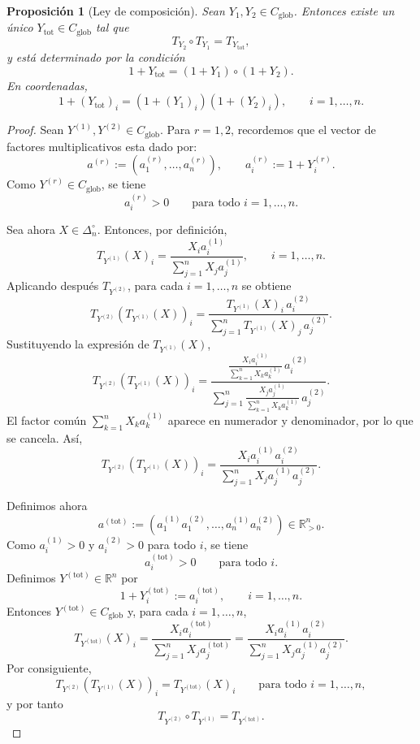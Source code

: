 ﻿\documentclass[12pt]{article}
\newtheorem{proposicion}{Proposición}[section]
\begin{document}
\begin{proposicion}[Ley de composición]\label{prop:composicionGlobal}
Sean $Y_1,Y_2\in C_{\mathrm{glob}}$. Entonces existe un único $Y_{\mathrm{tot}}\in C_{\mathrm{glob}}$ tal que
\[
T_{Y_2}\circ T_{Y_1}=T_{Y_{\mathrm{tot}}},
\]
y está determinado por la condición
\[
1+Y_{\mathrm{tot}}
=
(1+Y_1)\circ(1+Y_2).
\]
En coordenadas,
\[
1+(Y_{\mathrm{tot}})_i=(1+(Y_1)_i)(1+(Y_2)_i),
\qquad i=1,\dots,n.
\]
\end{proposicion}
\begin{proof}
Sean $Y^{(1)},Y^{(2)}\in C_{\mathrm{glob}}$. Para $r=1,2$, recordemos que el vector de factores multiplicativos esta dado por:
\[
a^{(r)}:=(a_1^{(r)},\dots,a_n^{(r)}),\qquad a_i^{(r)}:=1+Y_i^{(r)}.
\]
Como $Y^{(r)}\in C_{\mathrm{glob}}$, se tiene
\[
a_i^{(r)}>0\qquad \text{para todo } i=1,\dots,n.
\]

Sea ahora $X\in\Delta_n^\circ$. Entonces, por definición,
\[
T_{Y^{(1)}}(X)_i=\frac{X_i a_i^{(1)}}{\sum_{j=1}^n X_j a_j^{(1)}},\qquad i=1,\dots,n.
\]
Aplicando después $T_{Y^{(2)}}$, para cada $i=1,\dots,n$ se obtiene
\[
T_{Y^{(2)}}(T_{Y^{(1)}}(X))_i
=
\frac{T_{Y^{(1)}}(X)_i\,a_i^{(2)}}{\sum_{j=1}^n T_{Y^{(1)}}(X)_j\,a_j^{(2)}}.
\]
Sustituyendo la expresión de $T_{Y^{(1)}}(X)$,
\[
T_{Y^{(2)}}(T_{Y^{(1)}}(X))_i
=
\frac{
\displaystyle
\frac{X_i a_i^{(1)}}{\sum_{k=1}^n X_k a_k^{(1)}}\,a_i^{(2)}
}{
\displaystyle
\sum_{j=1}^n
\frac{X_j a_j^{(1)}}{\sum_{k=1}^n X_k a_k^{(1)}}\,a_j^{(2)}
}.
\]
El factor común $\sum_{k=1}^n X_k a_k^{(1)}$ aparece en numerador y denominador, por lo que se cancela. Así,
\[
T_{Y^{(2)}}(T_{Y^{(1)}}(X))_i
=
\frac{X_i a_i^{(1)} a_i^{(2)}}{\sum_{j=1}^n X_j a_j^{(1)} a_j^{(2)}}.
\]

Definimos ahora
\[
a^{(\mathrm{tot})}:=(a_1^{(1)}a_1^{(2)},\dots,a_n^{(1)}a_n^{(2)})\in \mathbb R_{>0}^n.
\]
Como $a_i^{(1)}>0$ y $a_i^{(2)}>0$ para todo $i$, se tiene
\[
a_i^{(\mathrm{tot})}>0\qquad \text{para todo } i.
\]
Definimos $Y^{(\mathrm{tot})}\in\mathbb R^n$ por
\[
1+Y_i^{(\mathrm{tot})}:=a_i^{(\mathrm{tot})},\qquad i=1,\dots,n.
\]
Entonces $Y^{(\mathrm{tot})}\in C_{\mathrm{glob}}$ y, para cada $i=1,\dots,n$,
\[
T_{Y^{(\mathrm{tot})}}(X)_i
=
\frac{X_i a_i^{(\mathrm{tot})}}{\sum_{j=1}^n X_j a_j^{(\mathrm{tot})}}
=
\frac{X_i a_i^{(1)} a_i^{(2)}}{\sum_{j=1}^n X_j a_j^{(1)} a_j^{(2)}}.
\]
Por consiguiente,
\[
T_{Y^{(2)}}(T_{Y^{(1)}}(X))_i=T_{Y^{(\mathrm{tot})}}(X)_i
\qquad \text{para todo } i=1,\dots,n,
\]
y por tanto
\[
T_{Y^{(2)}}\circ T_{Y^{(1)}}=T_{Y^{(\mathrm{tot})}}.
\]
\end{proof}
\end{document}
